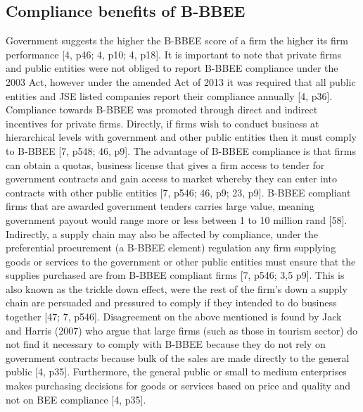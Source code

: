 \subsection{Compliance benefits of B-BBEE}
Government suggests the higher the B-BBEE score of a firm the higher its firm performance [4, p46; 4, p10; 4, p18]. It is important to note that private firms and public entities were not obliged to report B-BBEE compliance under the 2003 Act, however under the amended Act of 2013 it was required that all public entities and JSE listed companies report their compliance annually [4, p36]. Compliance towards B-BBEE was promoted through direct and indirect incentives for private firms. Directly, if firms wish to conduct business at hierarchical levels with government and other public entities then it must comply to B-BBEE [7, p548; 46, p9]. The advantage of B-BBEE compliance is that firms can obtain a quotas, business license that gives a firm access to tender for government contracts and gain access to market whereby they can enter into contracts with other public entities [7, p546; 46, p9; 23, p9]. B-BBEE compliant firms that are awarded government tenders carries large value, meaning government payout would range more or less between 1 to 10 million rand [58]. Indirectly, a supply chain may also be affected by compliance, under the preferential procurement (a B-BBEE element) regulation any firm supplying goods or services to the government or other public entities must ensure that the supplies purchased are from B-BBEE compliant firms [7, p546; 3,5 p9]. This is also known as the trickle down effect, were the rest of the firm's down a supply chain are persuaded and pressured to comply if they intended to do business together [47; 7, p546]. Disagreement on the above mentioned is found by Jack and Harris (2007) who argue that large firms (such as those in tourism sector) do not find it necessary to comply with B-BBEE because they do not rely on government contracts because bulk of the sales are made directly to the general public [4, p35]. Furthermore, the general public or small to medium enterprises makes purchasing decisions for goods or services based on price and quality and not on BEE compliance [4, p35].
